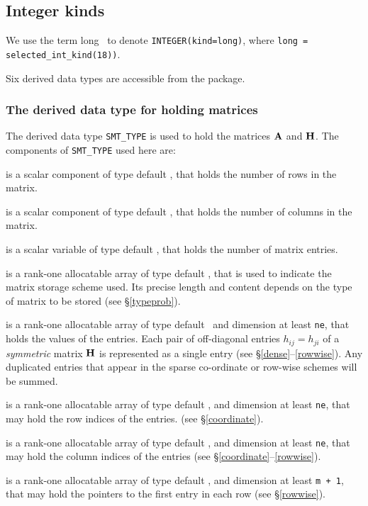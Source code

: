 \documentclass{galahad}
\begin{document}

\subsection{Integer kinds}\label{Integer kinds}
We use the term
long \integer\ to denote {\tt INTEGER\-(kind=long)}, where 
{\tt long = selected\_int\_kind(18))}.





\galtypes
Six derived data types are accessible from the package.


\subsubsection{The derived data type for holding matrices}\label{typesmt}
The derived data type {\tt SMT\_TYPE} is used to hold the matrices ${\mathbf{A}}$
and ${\mathbf{H}}$. The components of {\tt SMT\_TYPE} used here are:

\begin{description}

 is a scalar component of type default \integer, 
that holds the number of rows in the matrix. 
 
 is a scalar component of type default \integer, 
that holds the number of columns in the matrix. 
 
 is a scalar variable of type default \integer, that
holds the number of matrix entries.

 is a rank-one allocatable array of type default \character, that
is used to indicate the matrix storage scheme used. Its precise length and
content depends on the type of matrix to be stored (see \S\ref{typeprob}).

 is a rank-one allocatable array of type default \realdp\, 
and dimension at least {\tt ne}, that holds the values of the entries. 
Each pair of off-diagonal entries $h_{ij} = h_{ji}$ of a {\em symmetric}
matrix ${\mathbf{H}}$ is represented as a single entry 
(see \S\ref{dense}--\ref{rowwise}).
Any duplicated entries that appear in the sparse 
co-ordinate or row-wise schemes will be summed. 

 is a rank-one allocatable array of type default \integer, 
and dimension at least {\tt ne}, that may hold the row indices of the entries. 
(see \S\ref{coordinate}).

 is a rank-one allocatable array of type default \integer, 
and dimension at least {\tt ne}, that may hold the column indices of the entries
(see \S\ref{coordinate}--\ref{rowwise}).

 is a rank-one allocatable array of type default \integer, 
and dimension at least {\tt m + 1}, that may hold the pointers to
the first entry in each row (see \S\ref{rowwise}).

\end{description}
\end{document}
